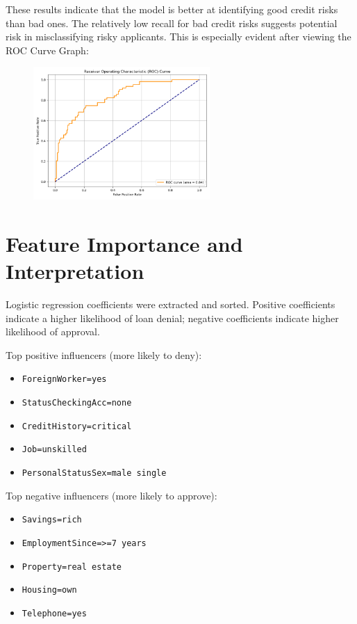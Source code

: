 \documentclass[12pt]{article}
\begin{document}
	These results indicate that the model is better at identifying good credit risks than bad ones. The relatively low recall for bad credit risks suggests potential risk in misclassifying risky applicants. This is especially evident after viewing the ROC Curve Graph:
	
	\begin{figure}[h]
		\centering
		\includegraphics[width=0.6\textwidth]{ROCCurve.png}
	\end{figure}
	
	\section{Feature Importance and Interpretation}
	Logistic regression coefficients were extracted and sorted. Positive coefficients indicate a higher likelihood of loan denial; negative coefficients indicate higher likelihood of approval.
	
	Top positive influencers (more likely to deny):
	\begin{itemize}
		\item \texttt{ForeignWorker=yes}
		\item \texttt{StatusCheckingAcc=none}
		\item \texttt{CreditHistory=critical}
		\item \texttt{Job=unskilled}
		\item \texttt{PersonalStatusSex=male single}
	\end{itemize}
	
	Top negative influencers (more likely to approve):
	\begin{itemize}
		\item \texttt{Savings=rich}
		\item \texttt{EmploymentSince=\textgreater=7 years}
		\item \texttt{Property=real estate}
		\item \texttt{Housing=own}
		\item \texttt{Telephone=yes}
	\end{itemize}
	
\end{document}
